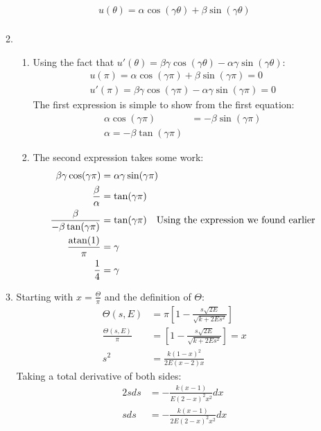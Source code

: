 \documentclass[12pt]{article}
\begin{document}
\begin{enumerate}
\begin{enumerate}
\begin{gather*}
        u(\theta)=\alpha\cos\left(\gamma\theta  \right)+\beta\sin\left(\gamma\theta  \right)\\
      \end{gather*}
      \item
      \begin{enumerate}
        \item Using the fact that $u'(\theta)=\beta\gamma\cos(\gamma\theta)-\alpha\gamma\sin(\gamma\theta)$:
        \begin{gather*}
          u(\pi)=\alpha\cos(\gamma\pi)+\beta\sin(\gamma\pi)=0\\
          u'(\pi)=\beta\gamma\cos(\gamma\pi)-\alpha\gamma\sin(\gamma\pi)=0
        \end{gather*}
        The first expression is simple to show from the first equation:
        \begin{align*}
          \alpha\cos(\gamma\pi)&=-\beta\sin(\gamma\pi)\\
          \alpha=-\beta\tan(\gamma\pi)
        \end{align*}
        \item The second expression takes some work:
        \begin{align*}
          \beta\gamma\cos(\gamma\pi)&=\alpha\gamma\sin(\gamma\pi)\\
          \frac{\beta}{\alpha}&=\tan(\gamma\pi)\\
          \frac{\beta}{-\beta\tan(\gamma\pi)}&=\tan(\gamma\pi)\quad\text{Using the expression we found earlier}\\
          \frac{\atan(1)}{\pi}&=\gamma\\
          \frac{1}{4}&=\gamma
        \end{align*}
      \end{enumerate}
      \item Starting with $x=\frac{\Theta}{\pi}$ and the definition of $\Theta$:
      \begin{align*}
        \Theta(s,E)&=\pi\left[1-\frac{s\sqrt{2E}}{\sqrt{k+2Es^2}}\right]\\
        \frac{\Theta(s,E)}{\pi}&=\left[1-\frac{s\sqrt{2E}}{\sqrt{k+2Es^2}}\right]=x\\
        s^2&=\frac{k(1-x)^2}{2E(x-2)x}
      \end{align*}
      Taking a total derivative of both sides:
      \begin{align*}
        2sds&=-\frac{k(x-1)}{E(2-x)^2 x^2}dx\\
        sds&=-\frac{k(x-1)}{2E(2-x)^2 x^2}dx

\end{align*}
\end{enumerate}
\end{enumerate}
\end{document}
